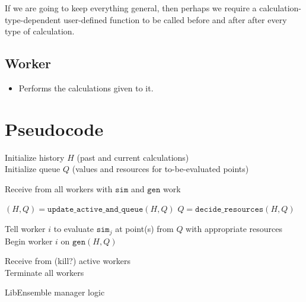 \documentclass{article}
\begin{document}
If we are going to keep everything general, then perhaps we require a
calculation-type-dependent user-defined function to be called before and after
after every type of calculation.

\subsection{Worker}
\begin{itemize}
  \item Performs the calculations given to it.
\end{itemize}


\section{Pseudocode}

\newpage
\LinesNumbered
\begin{algorithm}[t] %
  Initialize history $H$ (past and current calculations)\\
  Initialize queue $Q$ (values and resources for to-be-evaluated points) 

  
  {
    {
      Receive from all workers with $\mathtt{sim}$ and $\mathtt{gen}$ work\\
    }

    $(H,Q) = \mathtt{update\_active\_and\_queue}(H,Q)$
    $Q = \mathtt{decide\_resources}(H,Q)$

    {
      {
      Tell worker $i$ to evaluate $\mathtt{sim}_j$ at point(s) from $Q$ with appropriate resources
      }{
      Begin worker $i$ on $\mathtt{gen}(H,Q)$\\
      }
    }
  }
  Receive from (kill?) active workers\\ 
  Terminate all workers
  \caption{LibEnsemble manager logic \label{alg:manager}} 
\end{algorithm}
\end{document}
